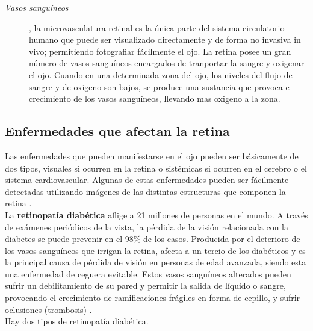 \begin{description}
\item[\normalfont\textit{Vasos sangu\'ineos}], la microvasculatura retinal es la \'unica parte del sistema circulatorio humano que puede ser visualizado directamente y de forma no invasiva in vivo; permitiendo fotografiar f\'acilmente el ojo. La retina posee un gran n\'umero de vasos sangu\'ineos encargados de tranportar la sangre y oxigenar el ojo. Cuando en una determinada zona del ojo, los niveles del flujo de sangre y de oxigeno son bajos, se produce una sustancia que provoca e crecimiento de los vasos sangu\'ineos, llevando mas oxigeno a la zona. \cite{heneghan2002characterization} \cite{lowell2004measurement}
\end{description}

	
\subsection{Enfermedades que afectan la retina}
Las enfermedades que pueden manifestarse en el ojo pueden ser b\'asicamente de dos tipos, visuales si ocurren en la retina o sist\'emicas si ocurren en el cerebro o el sistema cardiovascular. Algunas de estas enfermedades pueden ser f\'acilmente detectadas utilizando im\'agenes de las distintas estructuras que componen la retina \cite{abramoff2010retinal}.\\


La \textbf{retinopat\'ia diab\'etica}  aflige a 21 millones de personas en el mundo.  A trav\'es de ex\'amenes peri\'odicos de la vista, la p\'erdida de la visi\'on relacionada con la diabetes se puede prevenir en el 98\% de los casos. Producida por el deterioro de los vasos sangu\'ineos que irrigan la retina,  afecta a un tercio de los diab\'eticos  y es la principal causa de p\'erdida de visi\'on en personas de edad avanzada,  siendo esta una enfermedad de ceguera evitable. Estos vasos sangu\'ineos alterados pueden sufrir un debilitamiento de su pared y permitir la salida de l\'iquido o sangre, provocando el crecimiento de ramificaciones fr\'agiles en forma de cepillo, y sufrir oclusiones (trombosis) \cite{goh2016retinal}.\\

Hay dos tipos de retinopat\'ia diab\'etica. 

